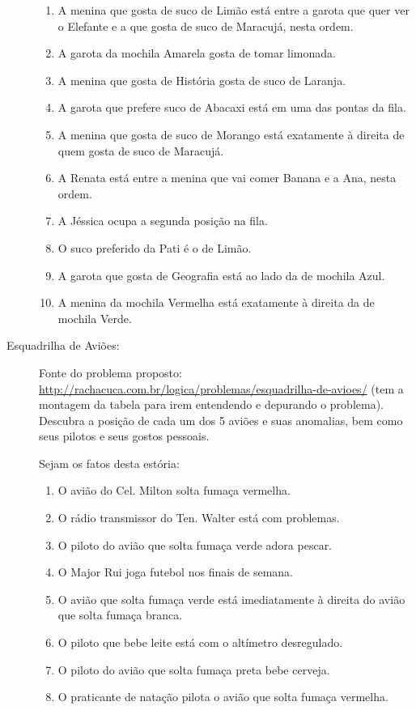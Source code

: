 \documentclass[a4paper,12pt]{article}
\begin{document}
\begin{description}
\begin{enumerate}
  \item A menina que gosta de suco de Limão está entre a garota que quer ver o Elefante e a que gosta de suco de Maracujá, nesta ordem.
  \item A garota da mochila Amarela gosta de tomar limonada.
  \item A menina que gosta de História gosta de suco de Laranja.
  \item A garota que prefere suco de Abacaxi está em uma das pontas da fila.
  \item A menina que gosta de suco de Morango está exatamente à direita de quem gosta de suco de Maracujá.
  \item A Renata está entre a menina que vai comer Banana e a Ana, nesta ordem.
  \item A Jéssica ocupa a segunda posição na fila.
  \item O suco preferido da Pati é o de Limão.
  \item A garota que gosta de Geografia está ao lado da de mochila Azul.
  \item A menina da mochila Vermelha está exatamente à direita da de mochila Verde.


  \end{enumerate}  



\newpage
  \item[Esquadrilha de Aviões:] Fonte do problema proposto:
  \url{http://rachacuca.com.br/logica/problemas/esquadrilha-de-avioes/} (tem a montagem da tabela para irem entendendo e depurando o problema).\\

Descubra a posição de cada um dos 5 aviões e suas anomalias, bem como seus pilotos e seus gostos pessoais.

Sejam os fatos desta estória:
\begin{enumerate}
  \item  O avião do Cel. Milton solta fumaça vermelha.
  \item O rádio transmissor do Ten. Walter está com problemas.
  \item O piloto do avião que solta fumaça verde adora pescar.
  \item O Major Rui joga futebol nos finais de semana.
  \item O avião que solta fumaça verde está imediatamente à direita do avião que solta fumaça branca.
  \item O piloto que bebe leite está com o altímetro desregulado.
  \item O piloto do avião que solta fumaça preta bebe cerveja.
  \item O praticante de natação pilota o avião que solta fumaça vermelha.
  

\end{enumerate}
\end{description}
\end{document}
